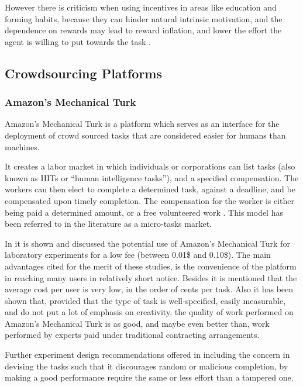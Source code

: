 \documentclass[letterpaper]{article}
\begin{document}
However there is criticism when using incentives in areas like education and forming habits, because they can hinder natural intrinsic motivation, and the dependence on rewards may lead to reward inflation, and lower the effort the agent is willing to put towards the task \cite{Irlenbusch2005}. 





\subsection{Crowdsourcing Platforms}


\subsubsection{Amazon’s Mechanical Turk}

Amazon's Mechanical Turk is a platform which serves as an interface for the deployment of crowd sourced tasks that are considered easier for humans than machines. 

It creates a labor market in which individuals or corporations can list tasks (also known as HITs or “human intelligence tasks”), and a specified compensation. The workers can then elect to complete a determined task, against a deadline, and be compensated upon timely completion. The compensation for the worker is either being paid a determined amount, or a free volunteered work \cite{Mason2010}. 
This model has been referred to in the literature as a micro-tasks market\cite{Kittur2008}.

In \cite{Mason2010} it is shown and discussed the potential use of Amazon’s Mechanical Turk for laboratory experiments for a low fee (between 0.01\$ and 0.10\$).
The main advantages cited for the merit of these studies, is the convenience of the platform in reaching many users in relatively short notice. Besides it is mentioned that the average cost per user is very low, in the order of cents per task.
Also it has been shown \cite{Kittur2008} that, provided that the type of task is well-specified, easily measurable, and do not put a lot of emphasis on creativity,  the quality of work performed on Amazon’s Mechanical Turk is as good, and maybe even better than, work performed by experts paid under traditional contracting arrangements.

Further experiment design recommendations offered in \cite{Kittur2008} including the concern in devising the tasks such that it discourages random or malicious completion, by making a good performance require the same or less effort than a tampered one.
\end{document}
